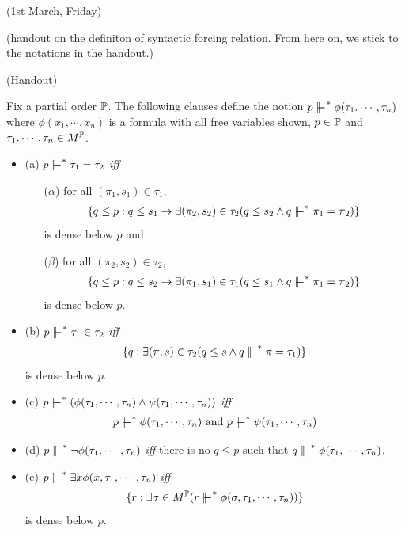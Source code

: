 \documentclass[12pt,a4paper]{article}
\renewenvironment{i}
{\begin{itemize} 
	}%
	{\end{itemize}
}
\begin{document}
\newday

(1st March, Friday)
\s

(handout on the definiton of syntactic forcing relation. From here on, we stick to the notations in the handout.)

\newday

(Handout)
\s

 Fix a partial order $\mathbb{P}$. The following clauses define the notion $p\forces^* \phi(\tau_1. \cdots, \tau_n)$ where $\phi(x_1, \cdots, x_n)$ is a formula with all free variables shown, $p\in\mathbb{P}$ and $\tau_1. \cdots, \tau_n \in M^{\mathbb{P}}$.
\begin{i}
\item[(a)] $p\forces^* \tau_1 = \tau_2$ \emph{iff}
\begin{itemize}
\item[($\alpha$)] for all $(\pi_1, s_1) \in \tau_1$,
\begin{align*}
\{ q\leq p : q\leq s_1 \rightarrow \exists (\pi_2, s_2) \in \tau_2 (q\leq s_2 \wedge q\forces^* \pi_1 = \pi_2) \}
\end{align*}
is dense below $p$ and
\item[($\beta$)] for all $(\pi_2, s_2) \in \tau_2$,
\begin{align*}
\{ q\leq p : q\leq s_2 \rightarrow \exists (\pi_1, s_1) \in \tau_1 (q\leq s_1 \wedge q\forces^* \pi_1 = \pi_2) \}
\end{align*}
is dense below $p$.
\end{itemize}
\item[(b)] $p\forces^* \tau_1 \in \tau_2$ \emph{iff}
\begin{align*}
\{ q: \exists (\pi, s) \in \tau_2 (q\leq s \wedge q \forces^* \pi =\tau_1) \}
\end{align*}
is dense below $p$.
\item[(c)] $p\forces^* (\phi(\tau_1, \cdots, \tau_n) \wedge \psi(\tau_1, \cdots, \tau_n))$ \emph{iff}
\begin{align*}
p\forces^* \phi(\tau_1, \cdots, \tau_n) \text{ and } p\forces^* \psi(\tau_1, \cdots, \tau_n)
\end{align*}
\item[(d)] $p\forces^* \neg \phi(\tau_1, \cdots, \tau_n)$ \emph{iff} there is no $q\leq p$ such that $q\forces^* \phi(\tau_1, \cdots, \tau_n)$.
\item[(e)] $p\forces^* \exists x \phi(x, \tau_1, \cdots, \tau_n)$ \emph{iff}
\begin{align*}
\{ r: \exists \sigma \in M^{\poset} (r\forces^* \phi(\sigma, \tau_1, \cdots, \tau_n))\}
\end{align*}
is dense below $p$.
\end{i}
\newday
\s
\end{document}
